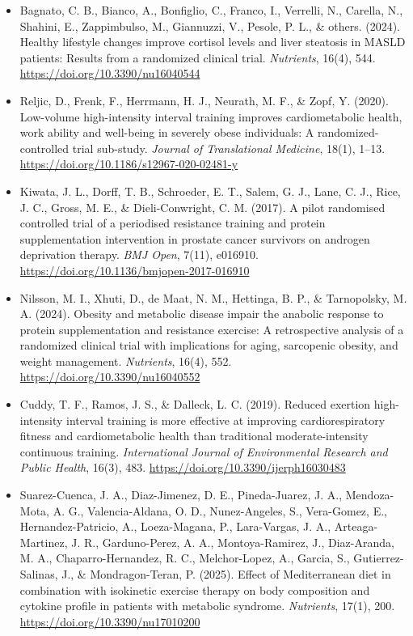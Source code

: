 \begin{itemize}
    \item Bagnato, C. B., Bianco, A., Bonfiglio, C., Franco, I., Verrelli, N., Carella, N., Shahini, E., Zappimbulso, M., Giannuzzi, V., Pesole, P. L., \& others. (2024). Healthy lifestyle changes improve cortisol levels and liver steatosis in MASLD patients: Results from a randomized clinical trial. \textit{Nutrients}, 16(4), 544. \url{https://doi.org/10.3390/nu16040544}

    \item Reljic, D., Frenk, F., Herrmann, H. J., Neurath, M. F., \& Zopf, Y. (2020). Low-volume high-intensity interval training improves cardiometabolic health, work ability and well-being in severely obese individuals: A randomized-controlled trial sub-study. \textit{Journal of Translational Medicine}, 18(1), 1–13. \url{https://doi.org/10.1186/s12967-020-02481-y}

    \item Kiwata, J. L., Dorff, T. B., Schroeder, E. T., Salem, G. J., Lane, C. J., Rice, J. C., Gross, M. E., \& Dieli-Conwright, C. M. (2017). A pilot randomised controlled trial of a periodised resistance training and protein supplementation intervention in prostate cancer survivors on androgen deprivation therapy. \textit{BMJ Open}, 7(11), e016910. \url{https://doi.org/10.1136/bmjopen-2017-016910}

    \item Nilsson, M. I., Xhuti, D., de Maat, N. M., Hettinga, B. P., \& Tarnopolsky, M. A. (2024). Obesity and metabolic disease impair the anabolic response to protein supplementation and resistance exercise: A retrospective analysis of a randomized clinical trial with implications for aging, sarcopenic obesity, and weight management. \textit{Nutrients}, 16(4), 552. \url{https://doi.org/10.3390/nu16040552}

    \item Cuddy, T. F., Ramos, J. S., \& Dalleck, L. C. (2019). Reduced exertion high-intensity interval training is more effective at improving cardiorespiratory fitness and cardiometabolic health than traditional moderate-intensity continuous training. \textit{International Journal of Environmental Research and Public Health}, 16(3), 483. \url{https://doi.org/10.3390/ijerph16030483}

    \item Suarez-Cuenca, J. A., Diaz-Jimenez, D. E., Pineda-Juarez, J. A., Mendoza-Mota, A. G., Valencia-Aldana, O. D., Nunez-Angeles, S., Vera-Gomez, E., Hernandez-Patricio, A., Loeza-Magana, P., Lara-Vargas, J. A., Arteaga-Martinez, J. R., Garduno-Perez, A. A., Montoya-Ramirez, J., Diaz-Aranda, M. A., Chaparro-Hernandez, R. C., Melchor-Lopez, A., Garcia, S., Gutierrez-Salinas, J., \& Mondragon-Teran, P. (2025). Effect of Mediterranean diet in combination with isokinetic exercise therapy on body composition and cytokine profile in patients with metabolic syndrome. \textit{Nutrients}, 17(1), 200. \url{https://doi.org/10.3390/nu17010200}


\end{itemize}
